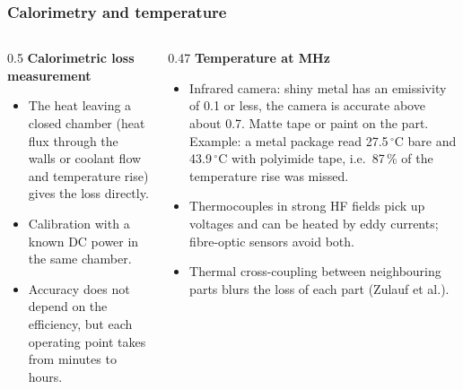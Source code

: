 \begin{frame}
	\frametitle{Calorimetry and temperature}
	\begin{columns}[T]
		\begin{column}{0.5\textwidth}
			\small
			\textbf{Calorimetric loss measurement}
			\begin{itemize}
				\item The heat leaving a closed chamber (heat flux through the walls or coolant flow and temperature rise) gives the loss directly.
				\item Calibration with a known DC power in the same chamber.
				\item Accuracy does not depend on the efficiency, but each operating point takes from minutes to hours.
			\end{itemize}
		\end{column}
		\begin{column}{0.47\textwidth}
			\small
			\textbf{Temperature at MHz}
			\begin{itemize}
				\item Infrared camera: shiny metal has an emissivity of 0.1 or less, the camera is accurate above about 0.7. Matte tape or paint on the part. Example: a metal package read 27.5\,$^\circ$C bare and 43.9\,$^\circ$C with polyimide tape, i.e.\ 87\,\% of the temperature rise was missed.
				\item Thermocouples in strong HF fields pick up voltages and can be heated by eddy currents; fibre-optic sensors avoid both.
				\item Thermal cross-coupling between neighbouring parts blurs the loss of each part (Zulauf et al.).
			\end{itemize}
		\end{column}
	\end{columns}
\end{frame}

